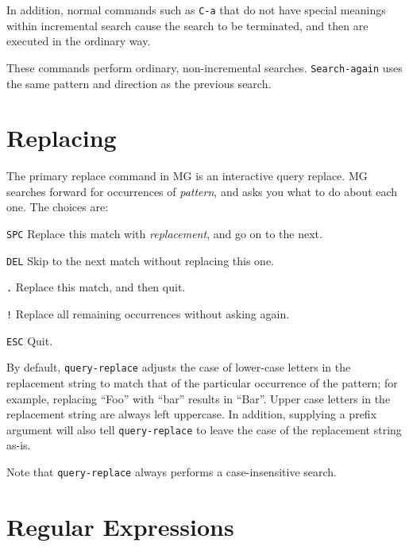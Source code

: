 In addition, normal commands such as \verb"C-a" that do not have special
meanings within incremental search cause the search to be terminated, and
then are executed in the ordinary way.

\fbody These commands perform ordinary, non-incremental searches.
{\tt Search-again} uses the same pattern and direction as the previous
search.

\section{Replacing}

\fbody The primary replace command in MG is an interactive query replace.
MG searches forward for occurrences of {\em pattern\/}, and asks you what
to do about each one.  The choices are:

\begin{define}{\hspace{1in}}

\item[{\tt SPC}\hfill] Replace this match with {\em replacement\/},
and go on to the next. 

\item[{\tt DEL}\hfill] Skip to the next match without replacing this one. 

\item[{\tt .}\hfill] Replace this match, and then quit. 

\item[{\tt !}\hfill] Replace all remaining occurrences without asking again. 

\item[{\tt ESC}\hfill] Quit.
\end{define}

By default, {\tt query-replace} adjusts the case of lower-case letters
in the replacement string to match that of the
particular occurrence of the pattern; for example, replacing ``Foo''
with ``bar'' results in ``Bar''.  Upper case letters in the replacement
string are always left uppercase.   In addition, supplying a prefix argument
will also tell {\tt query-replace} to leave the case of the replacement
string as-is.

Note that {\tt query-replace} always performs a case-insensitive search.



\section{Regular Expressions}

